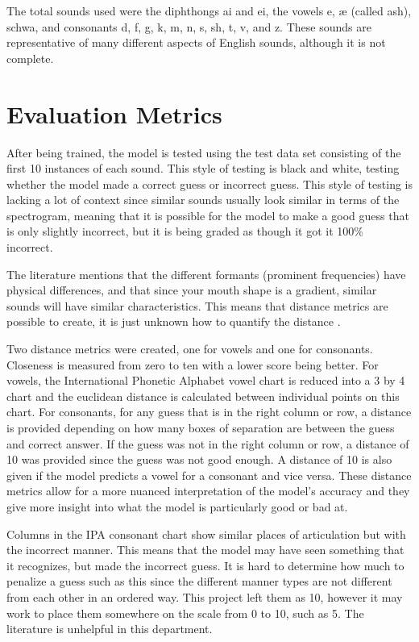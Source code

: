 \documentclass[10pt,twocolumn]{article}
\begin{document}
The total sounds used were the diphthongs ai and ei, the vowels e, æ (called ash), schwa, and consonants d, f, g, k, m, n, s, sh, t, v, and z. These sounds are representative of many different aspects of English sounds, although it is not complete.


\section{Evaluation Metrics}

After being trained, the model is tested using the test data set consisting of the first 10 instances of each sound. This style of testing is black and white, testing whether the model made a correct guess or incorrect guess. This style of testing is lacking a lot of context since similar sounds usually look similar in terms of the spectrogram, meaning that it is possible for the model to make a good guess that is only slightly incorrect, but it is being graded as though it got it 100\% incorrect. 

The literature mentions that the different formants (prominent frequencies) have physical differences, and that since your mouth shape is a gradient, similar sounds will have similar characteristics. This means that distance metrics are possible to create, it is just unknown how to quantify the distance \cite{InterpretationOfSpectrograms}. 

Two distance metrics were created, one for vowels and one for consonants. Closeness is measured from zero to ten with a lower score being better. For vowels, the International Phonetic Alphabet vowel chart is reduced into a 3 by 4 chart and the euclidean distance is calculated between individual points on this chart. For consonants, for any guess that is in the right column or row, a distance is provided depending on how many boxes of separation are between the guess and correct answer. If the guess was not in the right column or row, a distance of 10 was provided since the guess was not good enough. A distance of 10 is also given if the model predicts a vowel for a consonant and vice versa. These distance metrics allow for a more nuanced interpretation of the model's accuracy and they give more insight into what the model is particularly good or bad at. 

Columns in the IPA consonant chart show similar places of articulation but with the incorrect manner. This means that the model may have seen something that it recognizes, but made the incorrect guess. It is hard to determine how much to penalize a guess such as this since the different manner types are not different from each other in an ordered way. This project left them as 10, however it may work to place them somewhere on the scale from 0 to 10, such as 5. The literature is unhelpful in this department.
\end{document}
